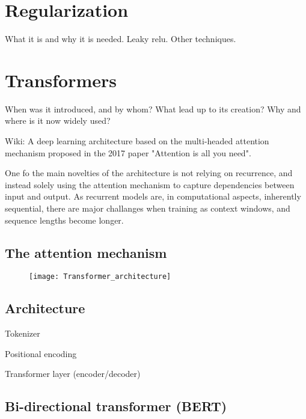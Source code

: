 \documentclass[../../thesis.tex]{subfiles}
\begin{document}

\section{Regularization}

What it is and why it is needed. Leaky relu. Other techniques.

\section{Transformers}

When was it introduced, and by whom?
What lead up to its creation?
Why and where is it now widely used? 


Wiki: A deep learning architecture based on the multi-headed attention mechanism proposed in the 2017 paper "Attention is all you need".

One fo the main novelties of the architecture is not relying on recurrence, and instead solely using the attention mechanism to capture dependencies between input and output. As recurrent models are, in computational aspects, inherently sequential, there are major challanges when training as context windows, and sequence lengths become longer. 



\subsection{The attention mechanism}


\begin{figure}[h]
    \texttt{[image: Transformer\_architecture]}
    \centering    
\end{figure}

\subsection{Architecture}

Tokenizer

Positional encoding


Transformer layer (encoder/decoder)

\subsection{Bi-directional transformer (BERT)}
\end{document}

